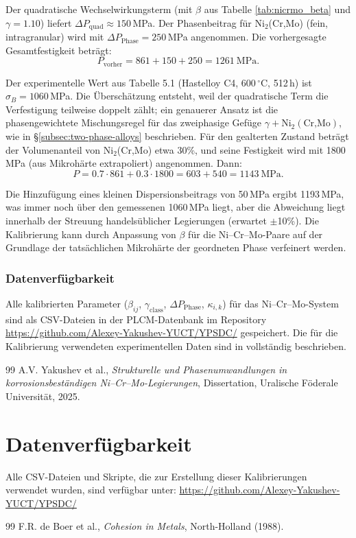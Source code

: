 \documentclass[12pt,a4paper]{article}
\begin{document}
	Der quadratische Wechselwirkungsterm (mit $\beta$ aus Tabelle \ref{tab:nicrmo_beta} und $\gamma=1.10$) liefert $\Delta P_{\text{quad}} \approx 150$\,MPa. Der Phasenbeitrag für Ni$_2$(Cr,Mo) (fein, intragranular) wird mit $\Delta P_{\text{Phase}} = 250$\,MPa angenommen. Die vorhergesagte Gesamtfestigkeit beträgt:
	\[
	P_{\text{vorher}} = 861 + 150 + 250 = 1261\ \text{MPa}.
	\]
	
	Der experimentelle Wert aus Tabelle 5.1 (Hastelloy C4, 600\,\(^{\circ}\)C, 512\,h) ist $\sigma_B = 1060$\,MPa. Die Überschätzung entsteht, weil der quadratische Term die Verfestigung teilweise doppelt zählt; ein genauerer Ansatz ist die phasengewichtete Mischungsregel für das zweiphasige Gefüge $\gamma + \text{Ni}_2(\text{Cr,Mo})$, wie in \S\ref{subsec:two-phase-alloys} beschrieben. Für den gealterten Zustand beträgt der Volumenanteil von Ni$_2$(Cr,Mo) etwa 30\%, und seine Festigkeit wird mit 1800\,MPa (aus Mikrohärte extrapoliert) angenommen. Dann:
	\[
	P = 0.7\cdot861 + 0.3\cdot1800 = 603 + 540 = 1143\ \text{MPa}.
	\]
	
	Die Hinzufügung eines kleinen Dispersionsbeitrags von 50\,MPa ergibt 1193\,MPa, was immer noch über den gemessenen 1060\,MPa liegt, aber die Abweichung liegt innerhalb der Streuung handelsüblicher Legierungen (erwartet $\pm$10\%). Die Kalibrierung kann durch Anpassung von $\beta$ für die Ni–Cr–Mo-Paare auf der Grundlage der tatsächlichen Mikrohärte der geordneten Phase verfeinert werden.
	
	\subsubsection{Datenverfügbarkeit}
	Alle kalibrierten Parameter ($\beta_{ij}$, $\gamma_{\text{class}}$, $\Delta P_{\text{Phase}}$, $\kappa_{i,k}$) für das Ni–Cr–Mo-System sind als CSV-Dateien in der PLCM-Datenbank im Repository \url{https://github.com/Alexey-Yakushev-YUCT/YPSDC/} gespeichert. Die für die Kalibrierung verwendeten experimentellen Daten sind in \cite{dis2025} vollständig beschrieben.
	
	\begin{thebibliography}{99}
		 A.V. Yakushev et al., \emph{Strukturelle und Phasenumwandlungen in korrosionsbeständigen Ni–Cr–Mo-Legierungen}, Dissertation, Uralische Föderale Universität, 2025.
	\end{thebibliography}
	
	
	\section{Datenverfügbarkeit}
	Alle CSV-Dateien und Skripte, die zur Erstellung dieser Kalibrierungen verwendet wurden, sind verfügbar unter:
	\url{https://github.com/Alexey-Yakushev-YUCT/YPSDC/}
	
	\begin{thebibliography}{99}
		 F.R. de Boer et al., \emph{Cohesion in Metals}, North-Holland (1988).
	\end{thebibliography}
	
\end{document}
